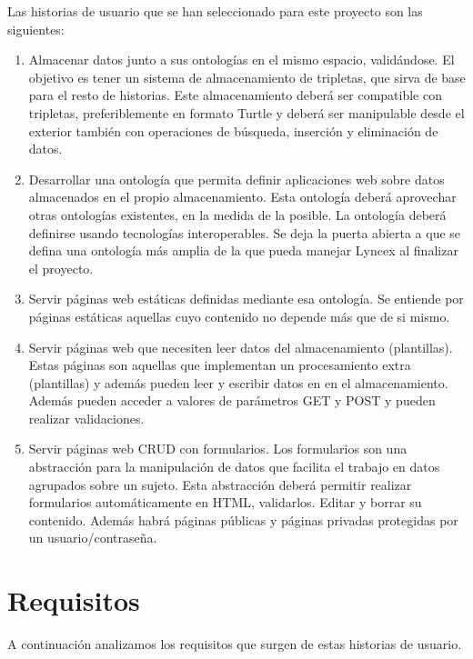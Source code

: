 \documentclass[12pt]{report} %
\begin{document}
Las historias de usuario que se han seleccionado para este proyecto son las siguientes:
\begin{enumerate}
    \item Almacenar datos junto a sus ontologías en el mismo espacio, validándose. El objetivo es tener un sistema de almacenamiento de tripletas, que sirva de base para el resto de historias. Este almacenamiento deberá ser compatible con tripletas, preferiblemente en formato Turtle y deberá ser manipulable desde el exterior también con operaciones de búsqueda, inserción y eliminación de datos.
    \item Desarrollar una ontología que permita definir aplicaciones web sobre datos almacenados en el propio almacenamiento. Esta ontología deberá aprovechar otras ontologías existentes, en la medida de la posible. La ontología deberá definirse usando tecnologías interoperables. Se deja la puerta abierta a que se defina una ontología más amplia de la que pueda manejar Lyncex al finalizar el proyecto.
    \item Servir páginas web estáticas definidas mediante esa ontología. Se entiende por páginas estáticas aquellas cuyo contenido no depende más que de si mismo.
    \item Servir páginas web que necesiten leer datos del almacenamiento (plantillas). Estas páginas son aquellas que implementan un procesamiento extra (plantillas) y además pueden leer y escribir datos en en el almacenamiento. Además pueden acceder a valores de parámetros GET y POST y pueden realizar validaciones.
    \item Servir páginas web CRUD con formularios. Los formularios son una abstracción para la manipulación de datos que facilita el trabajo en datos agrupados sobre un sujeto. Esta abstracción deberá permitir realizar formularios automáticamente en HTML, validarlos. Editar y borrar su contenido. Además habrá páginas públicas y páginas privadas protegidas por un usuario/contraseña.
\end{enumerate}

\section{Requisitos}

A continuación analizamos los requisitos que surgen de estas historias de usuario.
\end{document}
